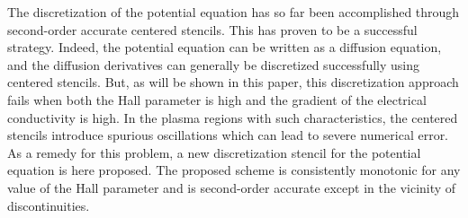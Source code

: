 \documentclass[twoside,9pt,twocolumn]{aiaa}
\begin{document}
The discretization of the potential equation has so far been accomplished through second-order accurate centered stencils. This has proven to be a successful strategy. Indeed, the potential equation can be written as a diffusion equation, and the diffusion derivatives can generally be discretized successfully using centered stencils. But, as will be shown in this paper, this discretization approach fails when both the  Hall parameter is high and the gradient of the electrical conductivity is high. In the plasma regions with such characteristics, the centered stencils introduce  spurious oscillations which can lead to severe numerical error. As a remedy for this problem, a new discretization stencil for the potential equation is here proposed. The proposed scheme is consistently monotonic for any value of the Hall parameter and is second-order accurate except in the vicinity of discontinuities.     
\end{document}
